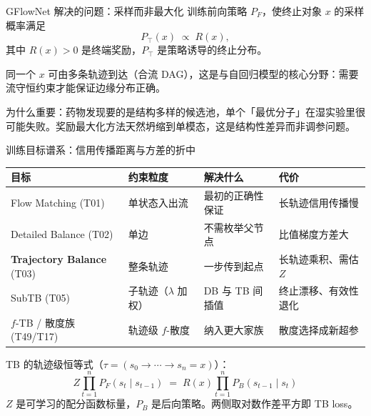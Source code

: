 \documentclass[aspectratio=169,10pt]{beamer}
\newcommand{\pos}[1]{\textcolor{positive}{#1}}
\newcommand{\con}[1]{\textcolor{negative}{#1}}
\begin{document}
\begin{frame}{GFlowNet 解决的问题：采样而非最大化}
  训练前向策略 $P_F$，使终止对象 $x$ 的采样概率满足
  \[
    P_\top(x) \;\propto\; R(x),
  \]
  其中 $R(x) > 0$ 是终端奖励，$P_\top$ 是策略诱导的终止分布。

  \vspace{8pt}
  \begin{center}
  \end{center}

  \vspace{4pt}
  同一个 $x$ 可由多条轨迹到达（合流 DAG），这是与自回归模型的核心分野：需要流守恒约束才能保证边缘分布正确。

  \vspace{4pt}
  \pos{为什么重要}：药物发现要的是结构多样的候选池，单个「最优分子」在湿实验里很可能失败。\con{奖励最大化方法天然坍缩到单模态}，这是结构性差异而非调参问题。
\end{frame}

\begin{frame}{训练目标谱系：信用传播距离与方差的折中}
  \vspace{4pt}
  \begin{center}
  \begin{tabular}{llll}
    \toprule
    目标 & 约束粒度 & 解决什么 & 代价 \\
    \midrule
    Flow Matching (T01) & 单状态入出流 & 最初的正确性保证 & 长轨迹信用传播慢 \\
    Detailed Balance (T02) & 单边 & 不需枚举父节点 & 比值梯度方差大 \\
    \textbf{Trajectory Balance} (T03) & 整条轨迹 & 一步传到起点 & 长轨迹乘积、需估 $Z$ \\
    SubTB (T05) & 子轨迹（$\lambda$ 加权） & DB 与 TB 间插值 & 终止漂移、有效性退化 \\
    $f$-TB / 散度族 (T49/T17) & 轨迹级 $f$-散度 & 纳入更大家族 & 散度选择成新超参 \\
    \bottomrule
  \end{tabular}
  \end{center}

  \vspace{8pt}
  TB 的轨迹级恒等式（$\tau = (s_0 \to \cdots \to s_n = x)$）：
  \[
    Z \prod_{t=1}^{n} P_F(s_t \mid s_{t-1}) \;=\; R(x) \prod_{t=1}^{n} P_B(s_{t-1} \mid s_t)
  \]
  $Z$ 是可学习的配分函数标量，$P_B$ 是后向策略。两侧取对数作差平方即 TB loss。
\end{frame}
\end{document}

